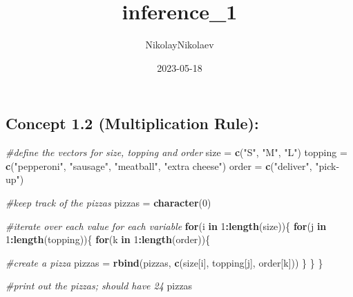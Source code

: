 \documentclass[
]{article}
\title{inference\_1}
\author{NikolayNikolaev}
\date{2023-05-18}
\newenvironment{Shaded}{\begin{snugshade}}{\end{snugshade}}
\newcommand{\CommentTok}[1]{\textcolor[rgb]{0.56,0.35,0.01}{\textit{#1}}}
\newcommand{\ControlFlowTok}[1]{\textcolor[rgb]{0.13,0.29,0.53}{\textbf{#1}}}
\newcommand{\DecValTok}[1]{\textcolor[rgb]{0.00,0.00,0.81}{#1}}
\newcommand{\FunctionTok}[1]{\textcolor[rgb]{0.13,0.29,0.53}{\textbf{#1}}}
\newcommand{\NormalTok}[1]{#1}
\newcommand{\OtherTok}[1]{\textcolor[rgb]{0.56,0.35,0.01}{#1}}
\newcommand{\SpecialCharTok}[1]{\textcolor[rgb]{0.81,0.36,0.00}{\textbf{#1}}}
\newcommand{\StringTok}[1]{\textcolor[rgb]{0.31,0.60,0.02}{#1}}
\begin{document}
\maketitle

\hypertarget{concept-1.2-multiplication-rule}{%
\subsection{Concept 1.2 (Multiplication
Rule):}\label{concept-1.2-multiplication-rule}}

\begin{Shaded}
\begin{Highlighting}[]
\CommentTok{\#define the vectors for size, topping and order}
\NormalTok{size }\OtherTok{=} \FunctionTok{c}\NormalTok{(}\StringTok{"S"}\NormalTok{, }\StringTok{"M"}\NormalTok{, }\StringTok{"L"}\NormalTok{)}
\NormalTok{topping }\OtherTok{=} \FunctionTok{c}\NormalTok{(}\StringTok{"pepperoni"}\NormalTok{, }\StringTok{"sausage"}\NormalTok{, }\StringTok{"meatball"}\NormalTok{, }\StringTok{"extra cheese"}\NormalTok{)}
\NormalTok{order }\OtherTok{=} \FunctionTok{c}\NormalTok{(}\StringTok{"deliver"}\NormalTok{, }\StringTok{"pick{-}up"}\NormalTok{)}

\CommentTok{\#keep track of the pizzas}
\NormalTok{pizzas }\OtherTok{=} \FunctionTok{character}\NormalTok{(}\DecValTok{0}\NormalTok{)}

\CommentTok{\#iterate over each value for each variable}
\ControlFlowTok{for}\NormalTok{(i }\ControlFlowTok{in} \DecValTok{1}\SpecialCharTok{:}\FunctionTok{length}\NormalTok{(size))\{}
  \ControlFlowTok{for}\NormalTok{(j }\ControlFlowTok{in} \DecValTok{1}\SpecialCharTok{:}\FunctionTok{length}\NormalTok{(topping))\{}
    \ControlFlowTok{for}\NormalTok{(k }\ControlFlowTok{in} \DecValTok{1}\SpecialCharTok{:}\FunctionTok{length}\NormalTok{(order))\{}
      
      \CommentTok{\#create a pizza}
\NormalTok{      pizzas }\OtherTok{=} \FunctionTok{rbind}\NormalTok{(pizzas, }\FunctionTok{c}\NormalTok{(size[i], topping[j], order[k]))}
\NormalTok{    \}}
\NormalTok{  \}}
\NormalTok{\}}

\CommentTok{\#print out the pizzas; should have 24}
\NormalTok{pizzas}
\end{Highlighting}
\end{Shaded}
\end{document}
